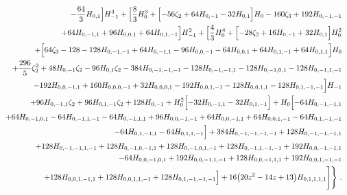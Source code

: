 \begin{eqnarray}
\nonumber \\ &&
-\frac{64}{3} H_{0,1}\Bigr]H_{-1}^3+\Bigl[\frac{8}{3} H_0^3+\Bigl[-56 \zeta_2+64H_{0,-1}
-32 H_{0,1}\Bigr] H_0-160\zeta_3+192 H_{0,-1,-1}
\nonumber \\ &&
+64 H_{0,-1,1}+96 H_{0,0,1}+64 H_{0,1,-1}
\Bigr] H_{-1}^2+\Bigl[\frac{4}{3} H_0^4+\Bigl[-28  \zeta_2+16H_{0,-1}+32  H_{0,1}\Bigr] H_0^2
\nonumber \\ &&
+\Bigl[64\zeta_3-128 -128 H_{0,-1,-1}+64 H_{0,-1,1}-96H_{0,0,-1}
-64 H_{0,0,1}+64 H_{0,1,-1}+64 H_{0,1,1}\Bigr] H_0
\nonumber \\ &&
+\frac{296}{5} \zeta_2^2
+48 H_{0,-1} \zeta_2-96H_{0,1} \zeta_2-384 H_{0,-1,-1,-1}
-128H_{0,-1,-1,1}-128  H_{0,-1,0,1}-128H_{0,-1,1,-1}
\nonumber \\ &&
-192  H_{0,0,-1,1}
+160H_{0,0,0,-1}+32 H_{0,0,0,1}
-192  H_{0,0,1,-1}-128 H_{0,0,1,1}-128 H_{0,1,-1,-1}
\Bigr] H_{-1}
\nonumber \\ &&
+96H_{0,-1,1} \zeta_2
+96 H_{0,1,-1} \zeta_2+128 H_{0,-1}
+H_0^2 \Bigl[-32  H_{0,-1,1}-32  H_{0,1,-1}\Bigr]
+H_0\Bigl[-64 H_{0,-1,-1,1}
\nonumber \\ &&
+64 H_{0,-1,0,1}
-64 H_{0,-1,1,-1}
-64 H_{0,-1,1,1}+96H_{0,0,-1,-1}+64 H_{0,0,-1,1}
+64 H_{0,0,1,-1}-64H_{0,1,-1,-1}
\nonumber \\ &&
-64 H_{0,1,-1,1}
-64H_{0,1,1,-1}\Bigr]
+384 H_{0,-1,-1,-1,-1}
+128H_{0,-1,-1,-1,1}
\nonumber \\ &&
+128 H_{0,-1,-1,1,-1}+128  H_{0,-1,0,-1,1}
+128 H_{0,-1,0,1,-1}+128 H_{0,-1,1,-1,-1}
+192 H_{0,0,-1,-1,1}
\nonumber \\ &&
-64  H_{0,0,-1,0,1}+192  H_{0,0,-1,1,-1}+128 H_{0,0,-1,1,1}
+192  H_{0,0,1,-1,-1}
\nonumber \\ &&
+128  H_{0,0,1,-1,1}+128 H_{0,0,1,1,-1}+128 H_{0,1,-1,-1,-1}
\Bigr]
+16 \big(20 z^2-14 z+13\big) H_{0,1,1,1,1}\Biggr]\Biggr\}~.
%
%
\end{eqnarray}
